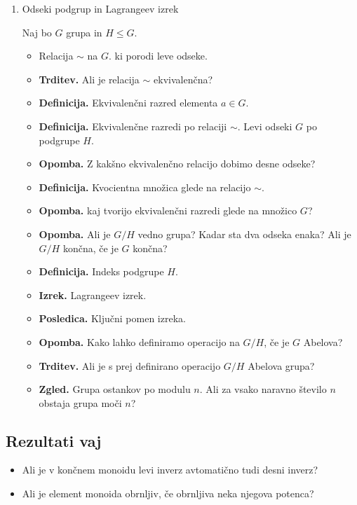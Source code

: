 \begin{enumerate}
    \item Odseki podgrup in Lagrangeev izrek
    
    Naj bo \(G\) grupa in \(H \leq G\).
    \begin{itemize}
        \item Relacija \(\sim\) na \(G\). ki porodi leve odseke.
        \item \textbf{Trditev.} Ali je relacija \(\sim\) ekvivalenčna?
        \item \textbf{Definicija.} Ekvivalenčni razred elementa \(a \in G\).
        \item \textbf{Definicija.} Ekvivalenčne razredi po relaciji \(\sim\). Levi odseki \(G\) po podgrupe \(H\).
        \item \textbf{Opomba.} Z kakšno ekvivalenčno relacijo dobimo desne odseke?
        \item \textbf{Definicija.} Kvocientna množica glede na relacijo \(\sim\).
        \item \textbf{Opomba.} kaj tvorijo ekvivalenčni razredi glede na množico \(G\)?
        \item \textbf{Opomba.} Ali je \(G/H\) vedno grupa? Kadar sta dva odseka enaka? Ali je \(G/H\) končna, če je \(G\) končna?
        \item \textbf{Definicija.} Indeks podgrupe \(H\).
        \item \textbf{Izrek.} Lagrangeev izrek.
        \item \textbf{Posledica.} Ključni pomen izreka.
        \item \textbf{Opomba.} Kako lahko definiramo operacijo na \(G/H\), če je \(G\) Abelova?
        \item \textbf{Trditev.} Ali je s prej definirano operacijo \(G/H\) Abelova grupa?
        \item \textbf{Zgled.} Grupa ostankov po modulu \(n\). Ali za vsako naravno število \(n\) obstaja grupa moči \(n\)?
    \end{itemize}
\end{enumerate}

\subsection*{Rezultati vaj}
\begin{itemize}
    \item Ali je v končnem monoidu levi inverz avtomatično tudi desni inverz?
    \item Ali je element monoida obrnljiv, če obrnljiva neka njegova potenca?
\end{itemize}